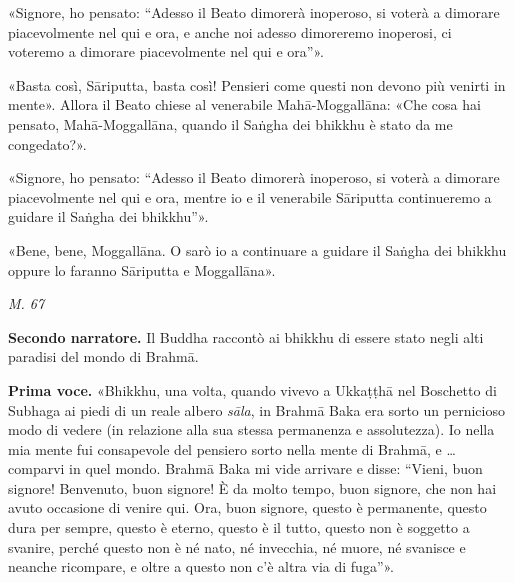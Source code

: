 «Signore, ho pensato: “Adesso il Beato dimorerà inoperoso, si voterà a
dimorare piacevolmente nel qui e ora, e anche noi adesso dimoreremo
inoperosi, ci voteremo a dimorare piacevolmente nel qui e ora”».


«Basta così, Sāriputta, basta così! Pensieri come questi non devono più
venirti in mente». Allora il Beato chiese al venerabile Mahā-Moggallāna:
«Che cosa hai pensato, Mahā-Moggallāna, quando il Saṅgha dei bhikkhu è
stato da me congedato?».


«Signore, ho pensato: “Adesso il Beato dimorerà inoperoso, si voterà a
dimorare piacevolmente nel qui e ora, mentre io e il venerabile
Sāriputta continueremo a guidare il Saṅgha dei bhikkhu”».


«Bene, bene, Moggallāna. O sarò io a continuare a guidare il Saṅgha dei
bhikkhu oppure lo faranno Sāriputta e Moggallāna».


\emph{M. 67}


\textbf{Secondo narratore.} Il Buddha raccontò ai bhikkhu di essere stato negli
alti paradisi del mondo di Brahmā.


\textbf{Prima voce.} «Bhikkhu, una volta, quando vivevo a Ukkaṭṭhā nel Boschetto
di Subhaga ai piedi di un reale albero \emph{sāla}, in Brahmā Baka era sorto
un pernicioso modo di vedere (in relazione alla sua stessa permanenza e
assolutezza). Io nella mia mente fui consapevole del pensiero sorto
nella mente di Brahmā, e … comparvi in quel mondo. Brahmā Baka mi vide
arrivare e disse: “Vieni, buon signore! Benvenuto, buon signore! È da
molto tempo, buon signore, che non hai avuto occasione di venire qui.
Ora, buon signore, questo è permanente, questo dura per sempre, questo è
eterno, questo è il tutto, questo non è soggetto a svanire, perché
questo non è né nato, né invecchia, né muore, né svanisce e neanche
ricompare, e oltre a questo non c’è altra via di fuga”».


